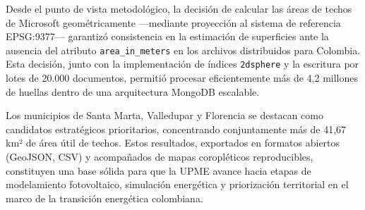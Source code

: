 \documentclass{article}
\begin{document}
Desde el punto de vista metodológico, la decisión de calcular las áreas 
de techos de Microsoft geométricamente —mediante proyección al sistema de 
referencia EPSG:9377— garantizó consistencia en la estimación de superficies 
ante la ausencia del atributo \texttt{area\_in\_meters} en los archivos 
distribuidos para Colombia. Esta decisión, junto con la implementación de 
índices \texttt{2dsphere} y la escritura por lotes de 20.000 documentos, 
permitió procesar eficientemente más de 4,2 millones de huellas dentro de 
una arquitectura MongoDB escalable.

Los municipios de Santa Marta, Valledupar y Florencia se destacan como 
candidatos estratégicos prioritarios, concentrando conjuntamente más de 
41,67 km² de área útil de techos. Estos resultados, exportados en formatos 
abiertos (GeoJSON, CSV) y acompañados de mapas coropléticos reproducibles, 
constituyen una base sólida para que la UPME avance hacia etapas de 
modelamiento fotovoltaico, simulación energética y priorización territorial 
en el marco de la transición energética colombiana.



\end{document}
